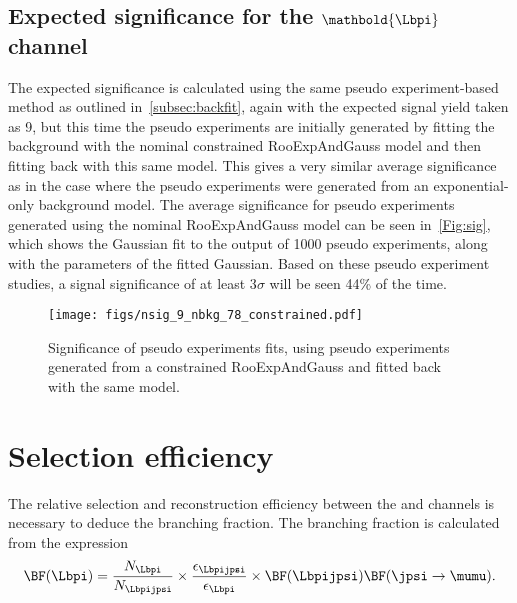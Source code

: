 \subsection[Expected significance for the $\Lbpi$ channel]{Expected significance for the $\mathbold{\Lbpi}$ channel}
\label{subsec:exp}
The expected significance is calculated using the same pseudo  experiment-based method as outlined in~\autoref{subsec:backfit}, again with the expected signal yield taken as 9, but this time the pseudo experiments are initially generated by fitting the background with the nominal constrained  RooExpAndGauss model and then fitting back with this same model. This gives a very similar average significance as in the case where the pseudo experiments were generated from an exponential-only background model. The average significance for pseudo experiments generated using the nominal RooExpAndGauss model can be seen in~\autoref{Fig:sig}, which shows the Gaussian fit to the output of 1000 pseudo experiments,  along with the parameters of the fitted Gaussian. Based on these pseudo experiment studies, a signal significance of at least 3$\sigma$ will be seen 44\% of the time. %

 \begin{figure}[h!]
  \def\nh{0.7\textwidth}
  \centering
  \texttt{[image: figs/nsig\_9\_nbkg\_78\_constrained.pdf]}
  \caption{Significance of pseudo experiments fits, using pseudo experiments generated from a constrained RooExpAndGauss and fitted back with the same model.}
  \label{Fig:sig}
 \end{figure}

 


 
\section{Selection efficiency}\label{Sec:Eff}
\label{sec:eff}
The relative selection and reconstruction efficiency between the \Lbpi and \Lbpijpsi channels is necessary to deduce the \Lbpi branching fraction. The branching fraction is calculated from the expression
\begin{equation}
  \BF(\Lbpi) = \frac{N_{\Lbpi}}{N_{\Lbpijpsi}}\times\frac{\epsilon_{\Lbpijpsi}}{\epsilon_{\Lbpi}}\times \BF(\Lbpijpsi)\BF(\jpsi\to\mumu). 
  \label{eq:norm2}
  \end{equation}

